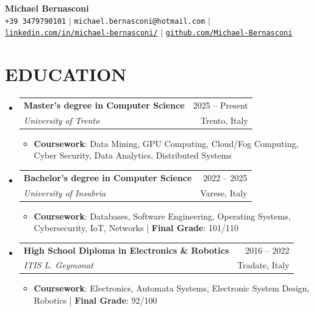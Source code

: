 \documentclass[letterpaper,10pt]{article}
\makeatletter
\newcommand{\resumeItem}[1]{
  \item\small{{#1 \vspace{0pt}}}
}
\newcommand{\resumeSubheading}[4]{
  \vspace{-2pt}\item
    \begin{tabular*}{\textwidth}[t]{l@{\extracolsep{\fill}}r}
      \textbf{#1} & {\color{dark-grey}\small #2}\vspace{0pt}\\ 
      \textit{\small #3} & {\color{dark-grey} \small #4}\\ 
    \end{tabular*}\vspace{-5pt}
}
\newcommand{\resumeSubHeadingListStart}{\begin{itemize}[leftmargin=0in, label={}]}
\newcommand{\resumeSubHeadingListEnd}{\end{itemize}\vspace{-4pt}}
\newcommand{\resumeItemListStart}{\begin{itemize}[leftmargin=0.15in]}
\newcommand{\resumeItemListEnd}{\end{itemize}\vspace{0pt}}
\makeatother
\begin{document}
\begin{center}
    \textbf{\Huge Michael Bernasconi} \\ \vspace{3pt}
    \small 
    \faPhone* \texttt{+39 3479790101} \hspace{2pt} $|$ \hspace{2pt}
    \faEnvelope \hspace{1pt} \texttt{michael.bernasconi@hotmail.com} \hspace{2pt} $|$ \hspace{2pt} \\
    \faLinkedin \hspace{1pt} \href{https://linkedin.com/in/michael-bernasconi/}{\texttt{linkedin.com/in/michael-bernasconi/}} \hspace{2pt} $|$ \hspace{2pt}
    \faGithub* \hspace{1pt} \href{https://github.com/Michael-Bernasconi}{\texttt{github.com/Michael-Bernasconi}}
    \\ \vspace{-6pt}
\end{center}

\section{EDUCATION}
  \resumeSubHeadingListStart
    \resumeSubheading
      {Master’s degree in Computer Science}{2025 -- Present}
      {University of Trento}{Trento, Italy}
      \resumeItemListStart
        \resumeItem{\textbf{Coursework}: Data Mining, GPU Computing, Cloud/Fog Computing, Cyber Security, Data Analytics, Distributed Systems}
      \resumeItemListEnd

    \resumeSubheading
      {Bachelor’s degree in Computer Science}{2022 -- 2025}
      {University of Insubria}{Varese, Italy}
      \resumeItemListStart
        \resumeItem{\textbf{Coursework}: Databases, Software Engineering, Operating Systems, Cybersecurity, IoT, Networks | \textbf{Final Grade}: 101/110}
      \resumeItemListEnd

    \resumeSubheading
      {High School Diploma in Electronics \& Robotics}{2016 -- 2022}
      {ITIS L. Geymonat}{Tradate, Italy}
      \resumeItemListStart
        \resumeItem{\textbf{Coursework}: Electronics, Automata Systems, Electronic System Design, Robotics | \textbf{Final Grade}: 92/100}
      \resumeItemListEnd
  \resumeSubHeadingListEnd
\end{document}
